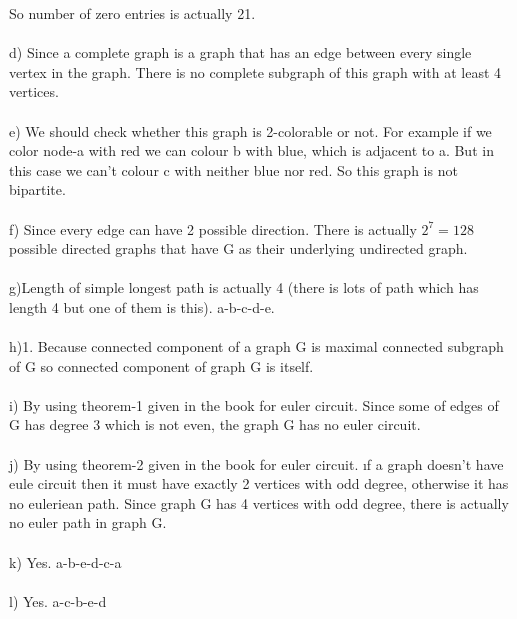 \documentclass[12pt]{article}
\begin{document}
So number of zero entries is actually 21.\\\\
d) Since a complete graph is a graph that has an edge between every single vertex in the graph. There is no complete subgraph of this graph with at least 4 vertices.\\\\e) We should check whether this graph is 2-colorable or not. For example if we color node-a with red we can colour b with blue, which is adjacent to a. But in this case we can't colour c with neither blue nor red. So this graph is not bipartite.
\\\\f) Since every edge can have 2 possible direction. There is actually $2^7=128$ possible directed graphs that have G as their underlying undirected graph.\\\\
g)Length of simple longest path is actually 4 (there is lots of path which has length 4 but one of them is this). a-b-c-d-e.\\\\
h)1. Because connected component of a graph G is maximal connected subgraph of G so connected component of graph G is itself. \\\\
i) By using theorem-1 given in the book for euler circuit. Since some of edges of G has degree 3 which is not even, the graph G has no euler circuit.\\\\
j) By using theorem-2 given in the book for euler circuit. ıf a graph doesn't have eule circuit then it must have exactly 2 vertices with odd degree, otherwise it has no euleriean path. Since graph G has 4 vertices with odd degree, there is actually no euler path in graph G.\\\\
k) Yes. a-b-e-d-c-a \\\\
l) Yes. a-c-b-e-d \\\\
\end{document}
